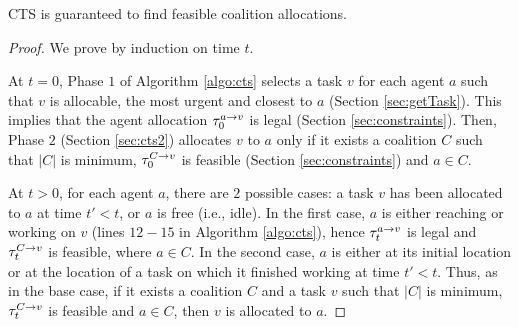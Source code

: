 
\begin{theorem}\label{teo:correctness}
    CTS is guaranteed to find feasible coalition allocations.
\end{theorem}
\begin{proof}
    We prove by induction on time $t$.

    At $t = 0$, Phase $1$ of Algorithm \ref{algo:cts} selects a task $v$ for each agent
    $a$ such that $v$ is allocable, the most urgent and closest to $a$ (Section
    \ref{sec:getTask}). This implies that the agent allocation $\tau^{a \rightarrow v}_{0}$ is legal
    (Section \ref{sec:constraints}). Then, Phase $2$ (Section \ref{sec:cts2}) allocates
    $v$ to $a$ only if it exists a coalition $C$ such that $|C|$ is minimum,
    $\tau^{C \rightarrow v}_{0}$ is feasible (Section \ref{sec:constraints}) and $a \in C$.

    At $t > 0$, for each agent $a$, there are $2$ possible cases: a task $v$ has been
    allocated to $a$ at time $t' < t$, or $a$ is free (i.e., idle). In the first case, $a$
    is either reaching or working on $v$ (lines $12 - 15$ in Algorithm \ref{algo:cts}),
    hence $\tau^{a \rightarrow v}_{t}$ is legal and $\tau^{C \rightarrow v}_{t}$ is feasible, where $a \in C$. In the
    second case, $a$ is either at its initial location or at the location of a task on
    which it finished working at time $t' < t$. Thus, as in the base case, if it exists a
    coalition $C$ and a task $v$ such that $|C|$ is minimum, $\tau^{C \rightarrow v}_{t}$ is feasible
    and $a \in C$, then $v$ is allocated to $a$.
\end{proof}

